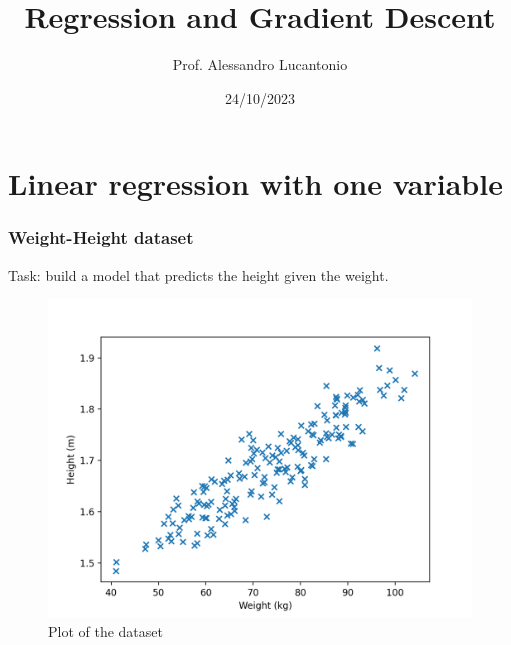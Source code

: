 \documentclass{beamer}
\title{Regression and Gradient Descent}
\author{Prof. Alessandro Lucantonio}
\institute{Aarhus University}
\date{24/10/2023}
\begin{document}
	
	\frame{\titlepage}
	
	\section{Linear regression with one variable}

	\begin{frame}
		\frametitle{Weight-Height dataset}
		
		Task: build a model that predicts the height given the weight. 
		
		\begin{figure}
			\centering
			\includegraphics[scale=0.5]{images/linear_regression_data}
			\caption{Plot of the dataset}
		\end{figure}
	\end{frame}
\end{document}
